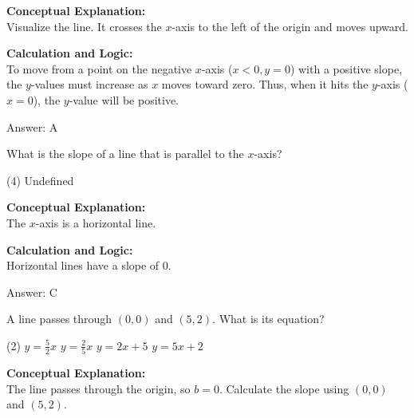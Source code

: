 \documentclass[11pt,paper=a4,answers]{exam}
\begin{document}
\begin{questions}
\begin{solution}
\textbf{Conceptual Explanation:} \\
Visualize the line. It crosses the $x$-axis to the left of the origin and moves upward.

\vspace{10pt}
\textbf{Calculation and Logic:} \\
To move from a point on the negative $x$-axis ($x < 0, y = 0$) with a positive slope, the $y$-values must increase as $x$ moves toward zero. Thus, when it hits the $y$-axis ($x=0$), the $y$-value will be positive.

\vspace{15pt}
Answer: \colorbox{yellow!100}{A}
\end{solution}

\vspace{20pt}

\question
What is the slope of a line that is parallel to the $x$-axis?
\begin{tasks}(4)
    \task Undefined
\end{tasks}

\begin{solution}
\textbf{Conceptual Explanation:} \\
The $x$-axis is a horizontal line.

\vspace{10pt}
\textbf{Calculation and Logic:} \\
Horizontal lines have a slope of 0.

\vspace{15pt}
Answer: \colorbox{yellow!100}{C}
\end{solution}

\vspace{20pt}

\question
A line passes through $(0, 0)$ and $(5, 2)$. What is its equation?
\begin{tasks}(2)
    \task $y = \frac{5}{2}x$
    \task $y = \frac{2}{5}x$
    \task $y = 2x + 5$
    \task $y = 5x + 2$
\end{tasks}

\begin{solution}
\textbf{Conceptual Explanation:} \\
The line passes through the origin, so $b = 0$. Calculate the slope using $(0,0)$ and $(5,2)$.


\end{solution}
\end{questions}
\end{document}
